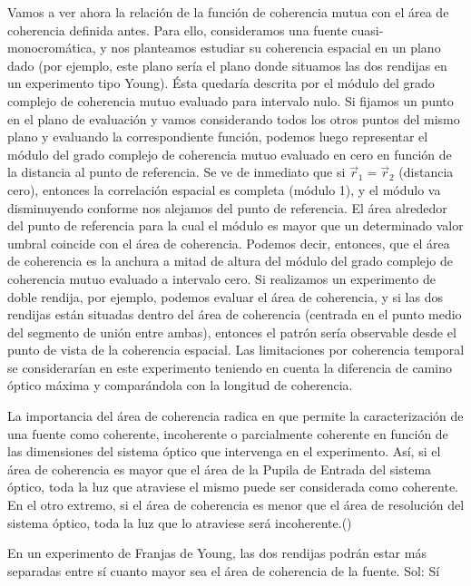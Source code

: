 \documentclass[12pt,a4paper]{report}
\newcommand{\esp}{\vspace{0.5cm}}
\begin{document}
	Vamos a ver ahora la relación de la función de coherencia mutua con el área de coherencia definida antes. Para ello, consideramos una fuente cuasi-monocromática, y nos planteamos estudiar su coherencia espacial en un plano dado (por ejemplo, este plano sería el plano donde situamos las dos rendijas en un experimento tipo Young). Ésta quedaría descrita por el módulo del grado complejo de coherencia mutuo evaluado para intervalo nulo. Si fijamos un punto en el plano de evaluación y vamos considerando todos los otros puntos del mismo plano y evaluando la correspondiente función, podemos luego representar el módulo del grado complejo de coherencia mutuo evaluado en cero en función de la distancia al punto de referencia. Se ve de inmediato que si $\vec{r}_1 = \vec{r}_2$ (distancia cero), entonces la correlación espacial es completa (módulo 1), y el módulo va disminuyendo conforme nos alejamos del punto de referencia. El área alrededor del punto de referencia para la cual el módulo es mayor que un determinado valor umbral coincide con el área de coherencia. Podemos decir, entonces, que el área de coherencia es la anchura a mitad de altura del módulo del grado complejo de coherencia mutuo evaluado a intervalo cero. Si realizamos un experimento de doble rendija, por ejemplo, podemos evaluar el área de coherencia, y si las dos rendijas están situadas dentro del área de coherencia (centrada en el punto medio del segmento de unión entre ambas), entonces el patrón sería observable desde el punto de vista de la coherencia espacial. Las limitaciones por coherencia temporal se considerarían en este experimento teniendo en cuenta la diferencia de camino óptico máxima y comparándola con la longitud de coherencia.
	
	\esp
	
	La importancia del área de coherencia radica en que permite la caracterización de una fuente como coherente, incoherente o parcialmente coherente en función de las dimensiones del sistema óptico que intervenga en el experimento. Así, si el área de coherencia es mayor que el área de la Pupila de Entrada del sistema óptico, toda la luz que atraviese el mismo puede ser considerada como coherente. En el otro extremo, si el área de coherencia es menor que el área de resolución del sistema óptico, toda la luz que lo atraviese será incoherente.(\cite{Resumen})
	
	\esp
	
	\begin{Socrative}
		En un experimento de Franjas de Young, las dos rendijas podrán  estar más separadas entre sí cuanto mayor sea el área de coherencia de la fuente. Sol: Sí
	\end{Socrative}
	
\end{document}
